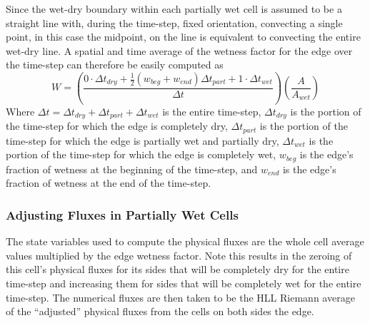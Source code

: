 \documentclass[letterpaper,10pt]{article}
\begin{document}
Since the wet-dry boundary within each partially wet cell is assumed 
to be a straight line with, during the time-step, fixed orientation, 
convecting a single point, in this case the midpoint, on the line is 
equivalent to convecting the entire wet-dry line.  A spatial and time 
average of the wetness factor for the edge over the time-step can 
therefore be easily computed as
\begin{equation}
	W=\left(\frac{0\cdot\Delta t_{dry} +\frac{1}{2}(w_{beg}+w_{end})\Delta t_{part}+1\cdot\Delta t_{wet}}{\Delta t}\right) \left(\frac{A}{A_{wet}}\right)
	\label{wetnessfactor}
\end{equation}
Where $\Delta t=\Delta t_{dry}+\Delta t_{part}+\Delta t_{wet}$ is the 
entire time-step, $\Delta t_{dry}$ is the portion of the time-step for 
which the edge is completely dry, $\Delta t_{part}$ is the portion of 
the time-step for which the edge is partially wet and partially dry, 
$\Delta t_{wet}$ is the portion of the time-step for which the edge is 
completely wet, $w_{beg}$ is the edge's fraction of wetness at the 
beginning of the time-step, and $w_{end}$ is the edge's fraction of 
wetness at the end of the time-step.\newline

\subsubsection{Adjusting Fluxes in Partially Wet Cells} \label{adjustfluxes}

The state variables used to compute the physical fluxes are the whole
cell average values multiplied by the edge wetness factor.  Note this 
results in the zeroing of this cell's physical fluxes for its sides 
that will be completely dry for the entire time-step and increasing 
them for sides that will be completely wet for the entire time-step.   
The numerical fluxes are then taken to be the HLL Riemann average of 
the ``adjusted'' physical fluxes from the cells on both sides the edge.  \newline
\end{document}
